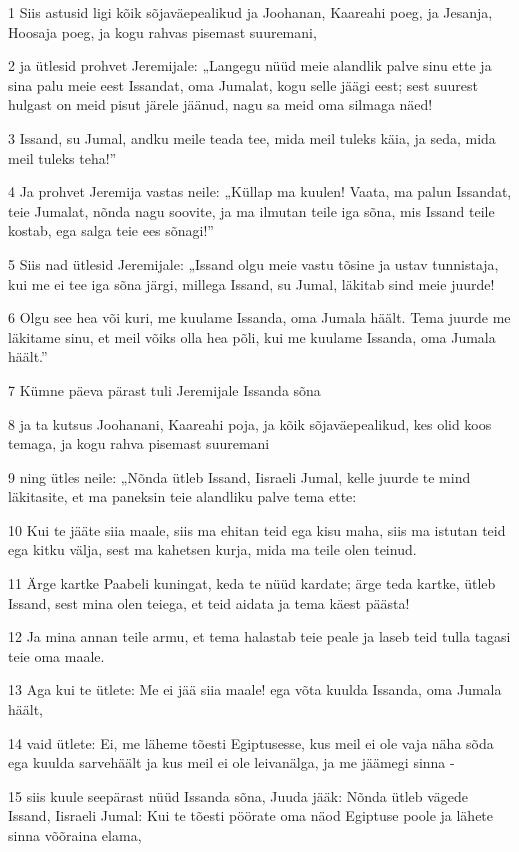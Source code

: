 \par 1 Siis astusid ligi kõik sõjaväepealikud ja Joohanan, Kaareahi poeg, ja Jesanja, Hoosaja poeg, ja kogu rahvas pisemast suuremani,
\par 2 ja ütlesid prohvet Jeremijale: „Langegu nüüd meie alandlik palve sinu ette ja sina palu meie eest Issandat, oma Jumalat, kogu selle jäägi eest; sest suurest hulgast on meid pisut järele jäänud, nagu sa meid oma silmaga näed!
\par 3 Issand, su Jumal, andku meile teada tee, mida meil tuleks käia, ja seda, mida meil tuleks teha!”
\par 4 Ja prohvet Jeremija vastas neile: „Küllap ma kuulen! Vaata, ma palun Issandat, teie Jumalat, nõnda nagu soovite, ja ma ilmutan teile iga sõna, mis Issand teile kostab, ega salga teie ees sõnagi!”
\par 5 Siis nad ütlesid Jeremijale: „Issand olgu meie vastu tõsine ja ustav tunnistaja, kui me ei tee iga sõna järgi, millega Issand, su Jumal, läkitab sind meie juurde!
\par 6 Olgu see hea või kuri, me kuulame Issanda, oma Jumala häält. Tema juurde me läkitame sinu, et meil võiks olla hea põli, kui me kuulame Issanda, oma Jumala häält.”
\par 7 Kümne päeva pärast tuli Jeremijale Issanda sõna
\par 8 ja ta kutsus Joohanani, Kaareahi poja, ja kõik sõjaväepealikud, kes olid koos temaga, ja kogu rahva pisemast suuremani
\par 9 ning ütles neile: „Nõnda ütleb Issand, Iisraeli Jumal, kelle juurde te mind läkitasite, et ma paneksin teie alandliku palve tema ette:
\par 10 Kui te jääte siia maale, siis ma ehitan teid ega kisu maha, siis ma istutan teid ega kitku välja, sest ma kahetsen kurja, mida ma teile olen teinud.
\par 11 Ärge kartke Paabeli kuningat, keda te nüüd kardate; ärge teda kartke, ütleb Issand, sest mina olen teiega, et teid aidata ja tema käest päästa!
\par 12 Ja mina annan teile armu, et tema halastab teie peale ja laseb teid tulla tagasi teie oma maale.
\par 13 Aga kui te ütlete: Me ei jää siia maale! ega võta kuulda Issanda, oma Jumala häält,
\par 14 vaid ütlete: Ei, me läheme tõesti Egiptusesse, kus meil ei ole vaja näha sõda ega kuulda sarvehäält ja kus meil ei ole leivanälga, ja me jäämegi sinna -
\par 15 siis kuule seepärast nüüd Issanda sõna, Juuda jääk: Nõnda ütleb vägede Issand, Iisraeli Jumal: Kui te tõesti pöörate oma näod Egiptuse poole ja lähete sinna võõraina elama,
